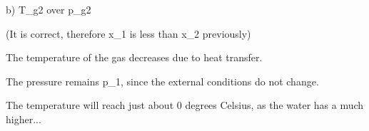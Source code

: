 b) T_g2 over p_g2

(It is correct, therefore x_1 is less than x_2 previously)

The temperature of the gas decreases due to heat transfer.

The pressure remains p_1, since the external conditions do not change.

The temperature will reach just about 0 degrees Celsius, as the water has a much higher...